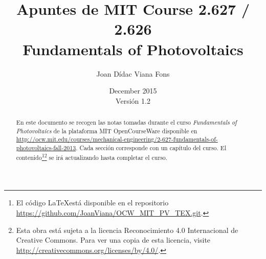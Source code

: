 \documentclass[11pt,a4paper]{article}
\author{Joan Dídac Viana Fons}
\title{Apuntes de MIT Course 2.627 / 2.626\\Fundamentals of Photovoltaics}
\date{December 2015\\Versión 1.2}
\begin{document}
\maketitle

	\begin{abstract}		
		\noindent En este documento se recogen las notas tomadas durante el curso {\em Fundamentals of Photovoltaics} de la plataforma MIT OpenCourseWare disponible en {\scriptsize \url{ http://ocw.mit.edu/courses/mechanical-engineering/2-627-fundamentals-of-photovoltaics-fall-2013}}. Cada sección corresponde con un capítulo del curso. El contenido{\footnote{El código \LaTeX  está disponible en el repositorio {\scriptsize \url{https://github.com/JoanViana/OCW_MIT_PV_TEX.git}}.}}{\footnote{Esta obra está sujeta a la licencia Reconocimiento 4.0 Internacional de Creative Commons. Para ver una copia de esta licencia, visite {\scriptsize \url{http://creativecommons.org/licenses/by/4.0/}}.}} se irá actualizando hasta completar el curso.
	\end{abstract}
	
\tableofcontents



%
%
%
%
%
%
%
%
%
%
%
%
%


%
%
%
%
\end{document}
